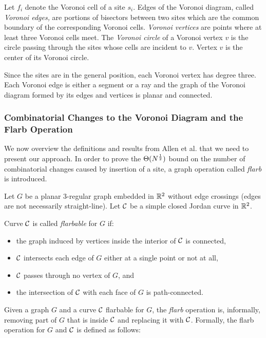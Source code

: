 \documentclass[a4paper,11pt]{article}
\begin{document}
Let  $f_i$ denote the Voronoi cell of a site $s_i$. Edges of the Voronoi diagram, called \emph{Voronoi edges,} are portions of bisectors between two sites which are the common boundary of the corresponding Voronoi cells. \emph{Voronoi vertices} are points where at least three Voronoi cells meet. The \emph{Voronoi circle} of a Voronoi vertex $v$ is the circle passing through the sites whose cells are incident to $v$. Vertex $v$ is the center of its Voronoi circle.

Since the sites are in the general position, each Voronoi vertex has degree three. Each Voronoi edge is either a segment or a ray and the graph of the Voronoi diagram formed by its edges and vertices is planar and connected.

\subsubsection{Combinatorial Changes to the Voronoi Diagram and the Flarb Operation}
\label{sec:defflarb}

We now overview the definitions and results from Allen et al. that we need to present our approach. In order to prove the $\Theta(N^\frac{1}{2})$ bound on the number of combinatorial changes caused by insertion of a site, a graph operation called \emph{flarb} is introduced.

Let $G$ be a planar 3-regular graph embedded in $\mathbb R^2$ without edge crossings (edges are not necessarily straight-line). Let $\mathcal C$ be a simple closed Jordan curve in $\mathbb R^2$. 

\begin{definition} 
Curve $\mathcal C$ is called \emph{flarbable} for $G$ if: \end{definition}

\begin{itemize}
	\item the graph induced by vertices inside the interior of $\mathcal C$ is connected,
	\item $\mathcal C$ intersects each edge of $G$ either at a single point or not at all,
	\item $\mathcal C$ passes through no vertex of $G$, and
	\item the intersection of $\mathcal C$ with each face of $G$ is path-connected.
\end{itemize}

Given a graph $G$ and a curve $\mathcal C$ flarbable for $G$, the \emph{flarb} operation is, informally, removing part of $G$ that is inside $\mathcal C$ and replacing it with $\mathcal C$. Formally, the flarb operation for $G$ and $\mathcal C$ is defined as follows:
\end{document}
